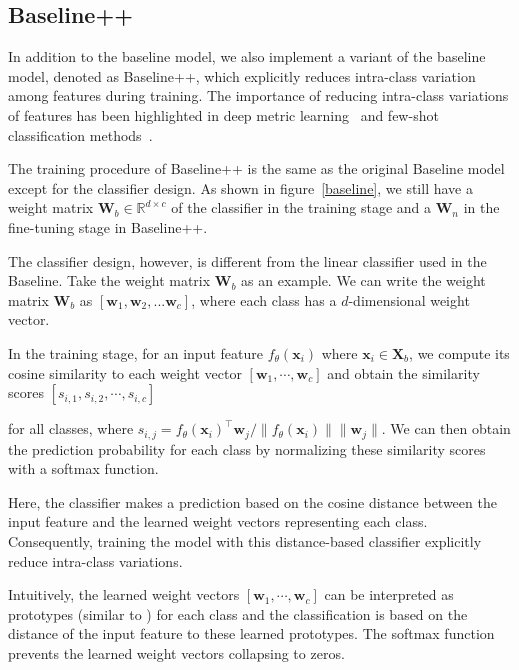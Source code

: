 \subsection{Baseline++}
\label{sec:baselineplus}

In addition to the baseline model, we also implement a variant of the baseline model, denoted as Baseline++, which explicitly reduces intra-class variation among features during training. The importance of reducing intra-class variations of features has been highlighted in deep metric learning~\cite{hu2015deep} and few-shot classification methods~\cite{gidaris2018dynamic}. 

The training procedure of Baseline++ is the same as the original Baseline model except for the classifier design. As shown in figure~\ref{baseline}, we still have a weight matrix $\mathbf{W}_b \in \mathbb{R}^{d \times c}$ of the classifier in the training stage and a $\mathbf{W}_n$ in the fine-tuning stage in Baseline++.

The classifier design, however, is different from the linear classifier used in the Baseline. Take the weight matrix $\mathbf{W}_b$ as an example. We can write the weight matrix $\mathbf{W}_b$ as $[\mathbf{w}_1,\mathbf{w}_2,...\mathbf{w}_c]$, where each class has a $d$-dimensional weight vector. 

In the training stage, for an input feature $f_\theta({\mathbf{x}_i})$ where $\mathbf{x}_i \in \mathbf{X}_b$, we compute its cosine similarity to each weight vector $\left[\mathbf{w}_1, \cdots, \mathbf{w}_c\right]$ and obtain the similarity scores $[s_{i,1}, s_{i,2}, \cdots, s_{i,c}]$ 

for all classes, where $s_{i,j} = f_\theta({\mathbf{x}_i})^\top\mathbf{w}_j/\|f_\theta({\mathbf{x}_i})\|\|\mathbf{w}_j\|$. 
We can then obtain the prediction probability for each class by normalizing these similarity scores with a softmax function.

Here, the classifier makes a prediction based on the cosine distance between the input feature and the learned weight vectors representing each class. Consequently, training the model with this distance-based classifier explicitly reduce intra-class variations.

Intuitively, the learned weight vectors $\left[\mathbf{w}_1, \cdots, \mathbf{w}_c\right]$ can be interpreted as prototypes (similar to \cite{snell2017prototypical,vinyals2016matching}) for each class and the classification is based on the distance of the input feature to these learned prototypes. The softmax function prevents the learned weight vectors collapsing to zeros.


